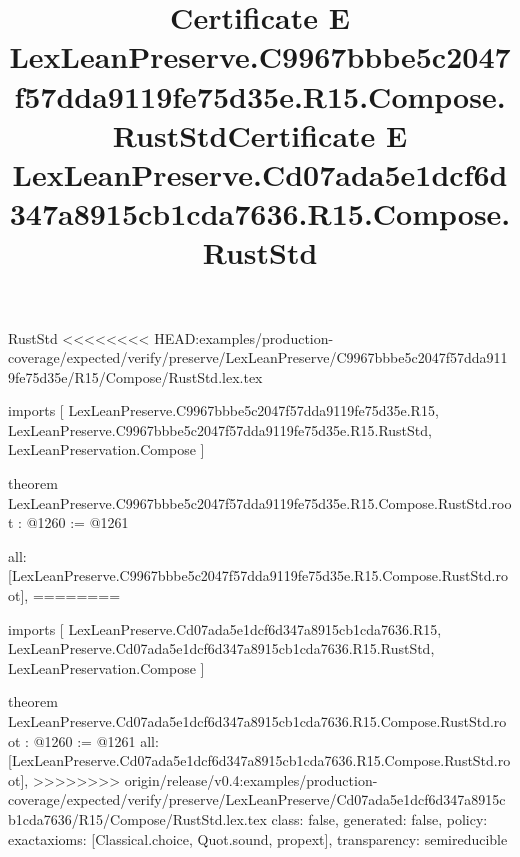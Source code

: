 \begin{lexlean}{RustStd}
<<<<<<<< HEAD:examples/production-coverage/expected/verify/preserve/LexLeanPreserve/C9967bbbe5c2047f57dda9119fe75d35e/R15/Compose/RustStd.lex.tex
\title{Certificate E LexLeanPreserve.C9967bbbe5c2047f57dda9119fe75d35e.R15.Compose.RustStd}
\begin{coremodule}
imports [
  LexLeanPreserve.C9967bbbe5c2047f57dda9119fe75d35e.R15,
  LexLeanPreserve.C9967bbbe5c2047f57dda9119fe75d35e.R15.RustStd,
  LexLeanPreservation.Compose
]

theorem LexLeanPreserve.C9967bbbe5c2047f57dda9119fe75d35e.R15.Compose.RustStd.root : @1260 := @1261 {
  all: [LexLeanPreserve.C9967bbbe5c2047f57dda9119fe75d35e.R15.Compose.RustStd.root],
========
\title{Certificate E LexLeanPreserve.Cd07ada5e1dcf6d347a8915cb1cda7636.R15.Compose.RustStd}
\begin{coremodule}
imports [
  LexLeanPreserve.Cd07ada5e1dcf6d347a8915cb1cda7636.R15,
  LexLeanPreserve.Cd07ada5e1dcf6d347a8915cb1cda7636.R15.RustStd,
  LexLeanPreservation.Compose
]

theorem LexLeanPreserve.Cd07ada5e1dcf6d347a8915cb1cda7636.R15.Compose.RustStd.root : @1260 := @1261 {
  all: [LexLeanPreserve.Cd07ada5e1dcf6d347a8915cb1cda7636.R15.Compose.RustStd.root],
>>>>>>>> origin/release/v0.4:examples/production-coverage/expected/verify/preserve/LexLeanPreserve/Cd07ada5e1dcf6d347a8915cb1cda7636/R15/Compose/RustStd.lex.tex
  class: false,
  generated: false,
  policy: exact{axioms: [Classical.choice, Quot.sound, propext]},
  transparency: semireducible
}


\end{coremodule}}
\end{coremodule}
\end{lexlean}

